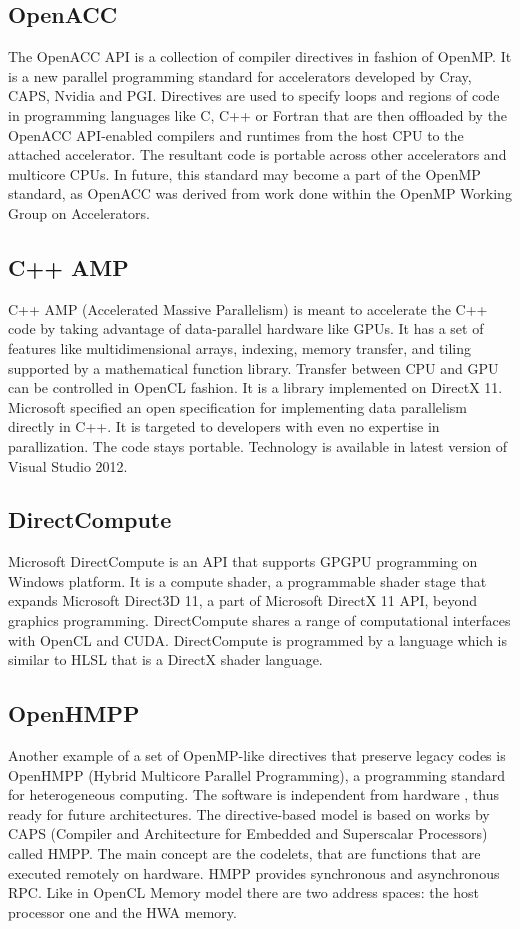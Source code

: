 \subsection{OpenACC}
The OpenACC API is a collection of compiler directives in fashion of OpenMP.\cite{openacc2012, openacc2012news2} It is a new parallel programming standard for accelerators developed by Cray, CAPS, Nvidia and PGI.  Directives are used to specify loops and regions of code in programming languages like C, C++ or Fortran that are then offloaded by the OpenACC API-enabled compilers and runtimes from the host CPU to the attached accelerator. The resultant code is portable across other accelerators and multicore CPUs. In future, this standard may become a part of the OpenMP standard, as OpenACC was derived from work done within the OpenMP Working Group on Accelerators.

\subsection{C++ AMP}
C++ AMP (Accelerated Massive Parallelism) is meant to accelerate the C++ code by taking advantage of data-parallel hardware like GPUs.\cite{microsoft2012cppamp, microsoft2012cppamp2} It has a set of features like multidimensional arrays, indexing, memory transfer, and tiling supported by a mathematical function library. Transfer between CPU and GPU can be controlled in OpenCL fashion. It is a library implemented on DirectX 11. Microsoft specified an open specification for implementing data parallelism directly in C++. It is targeted to developers with even no expertise in parallization. The code stays portable. Technology is available in latest version of Visual Studio 2012.

\subsection{DirectCompute}
Microsoft DirectCompute is an API that supports GPGPU programming on Windows platform.\cite{microsoft2012direct} It is a compute shader, a programmable shader stage that expands Microsoft Direct3D 11, a part of Microsoft DirectX 11 API, beyond graphics programming. DirectCompute shares a range of computational interfaces  with OpenCL and CUDA. DirectCompute is programmed by a language which is similar to HLSL that is a DirectX shader language.

\subsection{OpenHMPP}
Another example of a set of OpenMP-like directives that preserve legacy codes is OpenHMPP (Hybrid Multicore Parallel Programming), a programming standard for heterogeneous computing.\cite{openhmpp2012, caps2012hmpp} The software is independent from hardware , thus ready for future architectures. The directive-based model is based on works by CAPS (Compiler and Architecture for Embedded and Superscalar Processors) called HMPP. The main concept are the codelets, that are functions that are executed remotely on hardware. HMPP provides synchronous and asynchronous RPC. Like in OpenCL Memory model there are two address spaces: the host processor one and the HWA memory.

